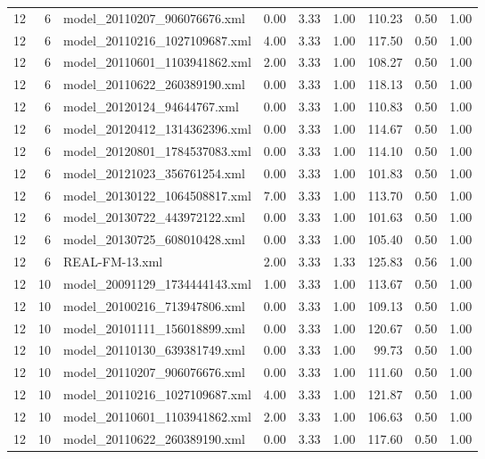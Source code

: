 \begin{table}[ht]
\begin{tabular}{rrlrrrrrr}
   12 &   6 & model\_20110207\_906076676.xml & 0.00 & 3.33 & 1.00 & 110.23 & 0.50 & 1.00 \\ 
   12 &   6 & model\_20110216\_1027109687.xml & 4.00 & 3.33 & 1.00 & 117.50 & 0.50 & 1.00 \\ 
   12 &   6 & model\_20110601\_1103941862.xml & 2.00 & 3.33 & 1.00 & 108.27 & 0.50 & 1.00 \\ 
   12 &   6 & model\_20110622\_260389190.xml & 0.00 & 3.33 & 1.00 & 118.13 & 0.50 & 1.00 \\ 
   12 &   6 & model\_20120124\_94644767.xml & 0.00 & 3.33 & 1.00 & 110.83 & 0.50 & 1.00 \\ 
   12 &   6 & model\_20120412\_1314362396.xml & 0.00 & 3.33 & 1.00 & 114.67 & 0.50 & 1.00 \\ 
   12 &   6 & model\_20120801\_1784537083.xml & 0.00 & 3.33 & 1.00 & 114.10 & 0.50 & 1.00 \\ 
   12 &   6 & model\_20121023\_356761254.xml & 0.00 & 3.33 & 1.00 & 101.83 & 0.50 & 1.00 \\ 
   12 &   6 & model\_20130122\_1064508817.xml & 7.00 & 3.33 & 1.00 & 113.70 & 0.50 & 1.00 \\ 
   12 &   6 & model\_20130722\_443972122.xml & 0.00 & 3.33 & 1.00 & 101.63 & 0.50 & 1.00 \\ 
   12 &   6 & model\_20130725\_608010428.xml & 0.00 & 3.33 & 1.00 & 105.40 & 0.50 & 1.00 \\ 
   12 &   6 & REAL-FM-13.xml & 2.00 & 3.33 & 1.33 & 125.83 & 0.56 & 1.00 \\ 
   12 &  10 & model\_20091129\_1734444143.xml & 1.00 & 3.33 & 1.00 & 113.67 & 0.50 & 1.00 \\ 
   12 &  10 & model\_20100216\_713947806.xml & 0.00 & 3.33 & 1.00 & 109.13 & 0.50 & 1.00 \\ 
   12 &  10 & model\_20101111\_156018899.xml & 0.00 & 3.33 & 1.00 & 120.67 & 0.50 & 1.00 \\ 
   12 &  10 & model\_20110130\_639381749.xml & 0.00 & 3.33 & 1.00 & 99.73 & 0.50 & 1.00 \\ 
   12 &  10 & model\_20110207\_906076676.xml & 0.00 & 3.33 & 1.00 & 111.60 & 0.50 & 1.00 \\ 
   12 &  10 & model\_20110216\_1027109687.xml & 4.00 & 3.33 & 1.00 & 121.87 & 0.50 & 1.00 \\ 
   12 &  10 & model\_20110601\_1103941862.xml & 2.00 & 3.33 & 1.00 & 106.63 & 0.50 & 1.00 \\ 
   12 &  10 & model\_20110622\_260389190.xml & 0.00 & 3.33 & 1.00 & 117.60 & 0.50 & 1.00 \\ 

\end{tabular}
\end{table}

